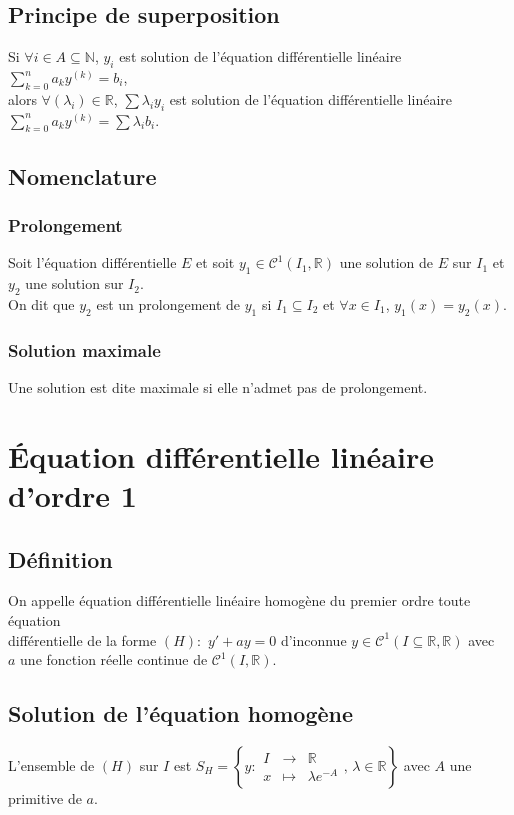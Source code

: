 \documentclass[a4paper,10pt]{book} %
\newcommand{\R}{\mathbb{R}}
\newcommand{\N}{\mathbb{N}}
\begin{document}
\newpage

\subsection{Principe de superposition}
Si $\forall i \in A\subseteq \N$, $y_i$ est solution de l'équation différentielle linéaire $\displaystyle\sum_{k=0}^n a_ky^{(k)}=b_i$,\\
alors $\forall (\lambda_i)\in\R$, $\displaystyle\sum\lambda_iy_i$ est solution de l'équation différentielle linéaire $\displaystyle\sum\limits_{k=0}^na_ky^{(k)}=\sum\lambda_ib_i$.

\subsection{Nomenclature}
\subsubsection{Prolongement}
Soit l'équation différentielle $E$ et soit $y_1 \in \mathcal{C}^1(I_1,\R)$ une solution de $E$ sur $I_1$ et $y_2$ une solution sur $I_2$.\\

On dit que $y_2$ est un prolongement de $y_1$ si $I_1\subseteq I_2$ et $\forall x\in I_1$, $y_1(x)=y_2(x)$.

\subsubsection{Solution maximale}
Une solution est dite maximale si elle n'admet pas de prolongement.

\section{Équation différentielle linéaire d'ordre 1}
\subsection{Définition}
On appelle équation différentielle linéaire homogène du premier ordre toute équation\\
différentielle de la forme $(H) :$ $y'+ay=0$ d'inconnue $y\in \mathcal{C}^1(I\subseteq\R,\R)$ avec\\
$a$ une fonction réelle continue de $\mathcal{C}^1(I,\R)$.

\subsection{Solution de l'équation homogène}
L'ensemble de $(H)$ sur $I$ est $S_H=\left\{ y: \begin{array}{rcl}I&\rightarrow& \R \\ x&\mapsto& \lambda e^{-A}\end{array}\text{, }\lambda\in \R\right\}$
avec $A$ une primitive de $a$.
\end{document}
